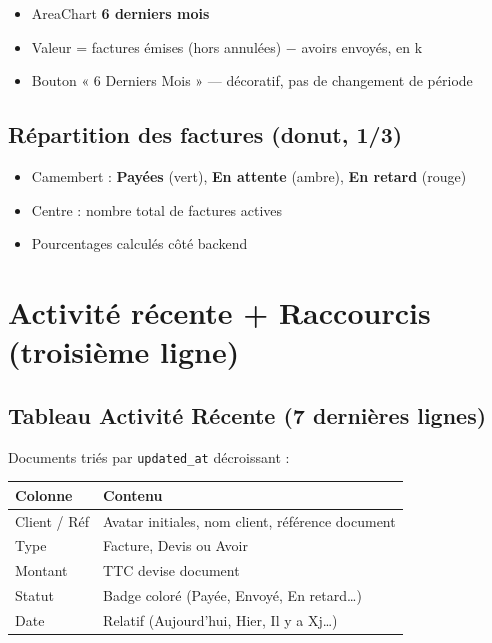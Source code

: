 \documentclass[11pt,a4paper]{report}
\begin{document}
\begin{itemize}[leftmargin=1.5em]
    \item AreaChart \textbf{6 derniers mois}
    \item Valeur = factures émises (hors annulées) $-$ avoirs envoyés, en k\,\€
    \item Bouton « 6 Derniers Mois » — \textcolor{copifiwarn}{décoratif, pas de changement de période}
\end{itemize}

\subsection{Répartition des factures (donut, 1/3)}

\begin{itemize}[leftmargin=1.5em]
    \item Camembert : \textbf{Payées} (vert), \textbf{En attente} (ambre), \textbf{En retard} (rouge)
    \item Centre : nombre total de factures actives
    \item Pourcentages calculés côté backend
\end{itemize}

\section{Activité récente + Raccourcis (troisième ligne)}

\subsection{Tableau Activité Récente (7 dernières lignes)}

Documents triés par \texttt{updated\_at} décroissant :

\begin{center}
\begin{tabular}{@{}ll@{}}
\toprule
\textbf{Colonne} & \textbf{Contenu} \\
\midrule
Client / Réf & Avatar initiales, nom client, référence document \\
Type & Facture, Devis ou Avoir \\
Montant & TTC devise document \\
Statut & Badge coloré (Payée, Envoyé, En retard…) \\
Date & Relatif (Aujourd'hui, Hier, Il y a Xj…) \\
\bottomrule
\end{tabular}
\end{center}
\end{document}
